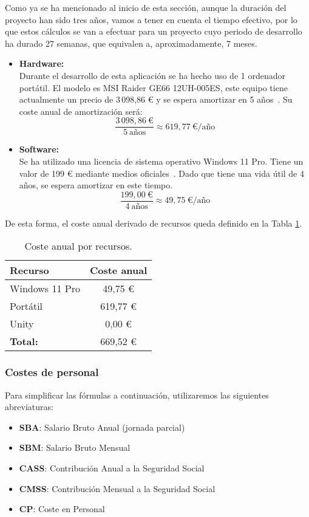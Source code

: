 Como ya se ha mencionado al inicio de esta sección, aunque la duración del proyecto han sido tres años, vamos a tener en cuenta el tiempo efectivo, por lo que estos cálculos se van a efectuar para un proyecto cuyo periodo de desarrollo ha durado 27 semanas, que equivalen a, aproximadamente, 7 meses.

\begin{itemize}
    \item \textbf{Hardware:}\\ 
    Durante el desarrollo de esta aplicación se ha hecho uso de 1 ordenador portátil. El modelo es MSI Raider GE66 12UH-005ES, este equipo tiene actualmente un precio de 3\,098,86 € y se espera amortizar en 5 años~\cite{portatil}.
    Su coste anual de amortización será: 
    \[
        \frac{3\,098,86\ \text{€}}{5\ \text{años}} \approx 619,77\ \text{€/año}
    \]

    \item \textbf{Software:}\\
    Se ha utilizado una licencia de sistema operativo Windows 11 Pro. Tiene un valor de 199 € mediante medios oficiales~\cite{windows}. Dado que tiene una vida útil de 4 años, se espera amortizar en este tiempo.
    \[
        \frac{199,00\ \text{€}}{4\ \text{años}} \approx 49,75\ \text{€/año}
    \]
\end{itemize}

De esta forma, el coste anual derivado de recursos queda definido en la Tabla \ref{CostResources}.

\vspace{1em}
\begin{table}[h!]
        \caption{Coste anual por recursos.}
	\label{CostResources}
	\centering
	\begin{tabular}{ l  c }
		\toprule
		\textbf{Recurso} & \textbf{Coste anual} \\ \midrule
		Windows 11 Pro & 49,75 €\\
		Portátil & 619,77 € \\
		Unity & 0,00 €\\
		\midrule
		\textbf{Total:} & 669,52 € \\
		\bottomrule
	\end{tabular}
\end{table}


\subsubsection{Costes de personal}
Para simplificar las fórmulas a continuación, utilizaremos las siguientes abreviaturas:
\begin{itemize}
    \item \textbf{SBA}: Salario Bruto Anual (jornada parcial)
    \item \textbf{SBM}: Salario Bruto Mensual
    \item \textbf{CASS}: Contribución Anual a la Seguridad Social
    \item \textbf{CMSS}: Contribución Mensual a la Seguridad Social
    \item \textbf{CP}: Coste en Personal
\end{itemize}

